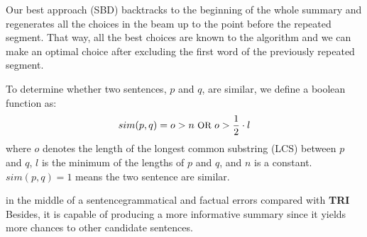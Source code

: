 Our best approach (SBD) backtracks to the beginning of the whole summary
and regenerates all the choices in the beam up to the point before
the repeated segment. That way, all the best choices are known to the
algorithm and we can make an optimal choice after excluding the first word
of the previously repeated segment. 

To determine whether two sentences, 
$p$ and $q$, are similar, we define a boolean function as:
\begin{equation}\label{eq:s}
\small
    sim(p,q) = o > n\text{ OR }o > \frac{1}{2}\cdot l
\end{equation}
where $o$ denotes the length of the longest common substring (LCS) between $p$ and $q$, 
$l$ is the minimum of the lengths of $p$ and $q$, and $n$ is a constant. 
$sim(p,q)=1$ means the two sentence are similar.

\DIFdelbegin {}\DIFdelend %
\DIFaddbegin {}\DIFaddend in the middle of a sentence\DIFdelbegin {}\DIFdelend \DIFaddbegin {}\DIFaddend grammatical and factual errors 
compared with \DIFdelbegin {}\DIFdelend \textbf{TRI}\DIFdelbegin {}\DIFdelend \DIFaddbegin {}\DIFaddend %
Besides, it is capable of producing a more informative summary since
it yields more chances to other candidate sentences.

